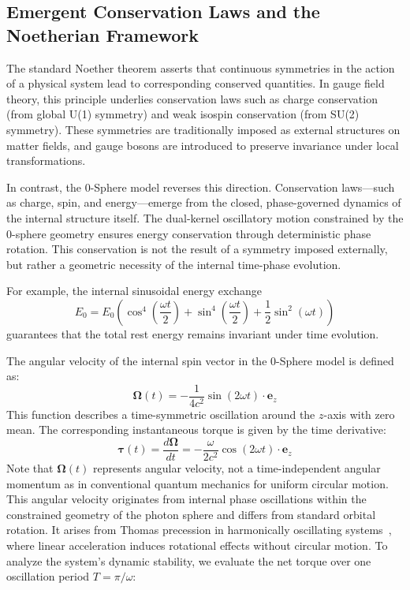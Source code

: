 \documentclass[%
 reprint,
 amsmath,amssymb,
 aps,
]{revtex4-1}
\numberwithin{equation}{section}%
\begin{document}
\subsection{Emergent Conservation Laws and the Noetherian Framework}

The standard Noether theorem asserts that continuous symmetries in the action of a physical system lead to corresponding conserved quantities. In gauge field theory, this principle underlies conservation laws such as charge conservation (from global U(1) symmetry) and weak isospin conservation (from SU(2) symmetry). These symmetries are traditionally imposed as external structures on matter fields, and gauge bosons are introduced to preserve invariance under local transformations.

In contrast, the 0-Sphere model reverses this direction. Conservation laws—such as charge, spin, and energy—emerge from the closed, phase-governed dynamics of the internal structure itself. The dual-kernel oscillatory motion constrained by the 0-sphere geometry ensures energy conservation through deterministic phase rotation. This conservation is not the result of a symmetry imposed externally, but rather a geometric necessity of the internal time-phase evolution.

For example, the internal sinusoidal energy exchange
\begin{equation}
E_0 = E_0 \left( \cos^4\left(\frac{\omega t}{2}\right) + \sin^4\left(\frac{\omega t}{2}\right) + \frac{1}{2}\sin^2(\omega t) \right)
\label{eq:energy_conservation_sinusoidal}
\end{equation}
guarantees that the total rest energy remains invariant under time evolution.

The angular velocity of the internal spin vector in the 0-Sphere model is defined as:
\begin{equation}
\boldsymbol{\Omega}(t) = -\frac{1}{4c^2} \sin(2\omega t) \cdot \boldsymbol{e}_z
\label{eq:angular_velocity_internal}
\end{equation}
This function describes a time-symmetric oscillation around the $z$-axis with zero mean. The corresponding instantaneous torque is given by the time derivative:
\begin{equation}
\boldsymbol{\tau}(t) = \frac{d\boldsymbol{\Omega}}{dt} = -\frac{\omega}{2c^2} \cos(2\omega t) \cdot \boldsymbol{e}_z
\label{eq:instantaneous_torque}
\end{equation}
Note that $\boldsymbol{\Omega}(t)$ represents angular velocity, not a time-independent angular momentum as in conventional quantum mechanics for uniform circular motion. This angular velocity originates from internal phase oscillations within the constrained geometry of the photon sphere and differs from standard orbital rotation. It arises from Thomas precession in harmonically oscillating systems~\cite{thomas1926}, where linear acceleration induces rotational effects without circular motion. To analyze the system's dynamic stability, we evaluate the net torque over one oscillation period $T = \pi/\omega$:
\end{document}
